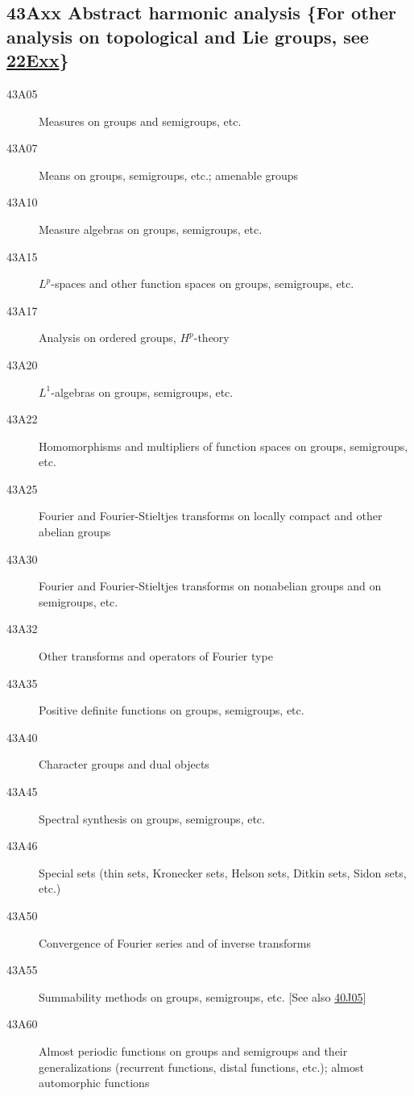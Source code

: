\subsection*{43Axx  Abstract harmonic analysis \{For other analysis on topological and Lie groups, see \hyperref[22Exx]{22Exx}\} }\label{43Axx}
\begin{description}  
\item [43A05]\label{43A05} Measures on groups and semigroups, etc.
\item [43A07]\label{43A07} Means on groups, semigroups, etc.; amenable groups
\item [43A10]\label{43A10} Measure algebras on groups, semigroups, etc.
\item [43A15]\label{43A15} $L^p$-spaces and other function spaces on groups, semigroups, etc.
\item [43A17]\label{43A17} Analysis on ordered groups, $H^p$-theory
\item [43A20]\label{43A20} $L^1$-algebras on groups, semigroups, etc.
\item [43A22]\label{43A22} Homomorphisms and multipliers of function spaces on groups, semigroups, etc.
\item [43A25]\label{43A25} Fourier and Fourier-Stieltjes transforms on locally compact and other abelian groups
\item [43A30]\label{43A30} Fourier and Fourier-Stieltjes transforms on nonabelian groups and on semigroups, etc.
\item [43A32]\label{43A32} Other transforms and operators of Fourier type
\item [43A35]\label{43A35} Positive definite functions on groups, semigroups, etc.
\item [43A40]\label{43A40} Character groups and dual objects
\item [43A45]\label{43A45} Spectral synthesis on groups, semigroups, etc.
\item [43A46]\label{43A46} Special sets (thin sets, Kronecker sets, Helson sets, Ditkin sets, Sidon sets, etc.)
\item [43A50]\label{43A50} Convergence of Fourier series and of inverse transforms
\item [43A55]\label{43A55} Summability methods on groups, semigroups, etc. [See also \hyperref[40J05]{40J05}]
\item [43A60]\label{43A60} Almost periodic functions on groups and semigroups and their generalizations (recurrent functions, distal functions, etc.); almost automorphic functions

\end{description}
